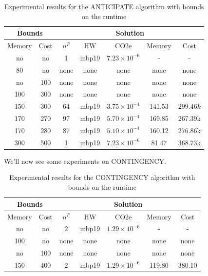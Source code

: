 \documentclass[a4paper,singleside,12pt]{report} %
\begin{document}
\begin{table}[h!]
    \centering
    \begin{tabular}{cc|ccccc}
        \hline
        \multicolumn{2}{c|}{Bounds} & \multicolumn{5}{c}{Solution} \\
        \hline
        Memory & Cost & $n^P$ & HW & CO2e & Memory & Cost \\
        \hline
        no & no & 1 & mbp19 & $7.23 \times 10^{-6}$ & - & - \\
        80 & no & none & none & none & none & none \\
        no & 100 & none & none & none & none & none \\
        100 & 300 & none & none & none & none & none \\
        150 & 300 & 64 & mbp19 & $3.75 \times 10^{-4}$ & $141.53$ & $299.46k$ \\
        170 & 270 & 97 & mbp19 & $5.70 \times 10^{-4}$ & 169.85 & 267.39k \\
        170 & 280 & 87 & mbp19 & $5.10 \times 10^{-4}$ & 160.12 & 276.86k \\
        300 & 500 & 1 & mbp19 & $7.23 \times 10^{-6}$ & 81.47 & 368.73k \\
        \hline
    \end{tabular}
    \caption{Experimental results for the ANTICIPATE algorithm with bounds on the runtime}
    \label{tab:anticipate_results}
\end{table}

We'll now see some experiments on CONTINGENCY.

\begin{table}[h!]
    \centering
    \begin{tabular}{cc|ccccc}
        \hline
        \multicolumn{2}{c|}{Bounds} & \multicolumn{5}{c}{Solution} \\
        \hline
        Memory & Cost & $n^P$ & HW & CO2e & Memory & Cost \\
        \hline
        no & no & 2 & mbp19 & $1.29 \times 10^{-6}$ & - & - \\
        100 & no & none & none & none & none & none \\
        no & 100 & none & none & none & none & none \\
        150 & 400 & 2 & mbp19 & $1.29 \times 10^{-6}$ & 119.80 & 380.10 \\
        \hline
    \end{tabular}
    \caption{Experimental results for the CONTINGENCY algorithm with bounds on the runtime}
    \label{tab:contingency_results}
\end{table}
\end{document}
